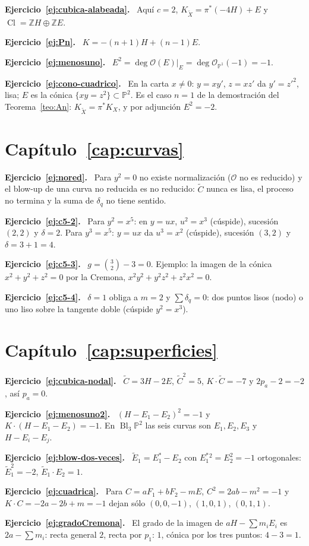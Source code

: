 \documentclass[11pt,a4paper,oneside]{book}
\newcommand{\Bl}{\operatorname{Bl}}
\newcommand{\Cl}{\operatorname{Cl}}
\newcommand{\PP}{\mathbb{P}}
\newcommand{\ZZ}{\mathbb{Z}}
\newcommand{\cO}{\mathcal{O}}
\theoremstyle{plain}
\theoremstyle{definition}
\theoremstyle{remark}
\newcommand{\sol}[1]{\par\medskip\noindent\textbf{Ejercicio~\ref{#1}.}\ }
\begin{document}
\sol{ej:cubica-alabeada} Aquí $c=2$, $K_{\tilde X}=\pi^*(-4H)+E$ y $\Cl=\ZZ H\oplus\ZZ E$.

\sol{ej:Pn} $K=-(n+1)H+(n-1)E$.

\sol{ej:menosuno} $E^2=\deg\cO(E)|_E=\deg\cO_{\PP^1}(-1)=-1$.

\sol{ej:cono-cuadrico} En la carta $x\neq0$: $y=xy'$, $z=xz'$ da $y'=z'^2$, lisa; $E$ es la cónica $\{xy=z^2\}\subset\PP^2$. Es el caso $n=1$ de la demostración del Teorema~\ref{teo:An}: $K_{\tilde X}=\pi^*K_X$, y por adjunción $E^2=-2$.

\section*{Capítulo~\ref{cap:curvas}}
\sol{ej:nored} Para $y^2=0$ no existe normalización ($\cO$ no es reducido) y el blow-up de una curva no reducida es no reducido: $\tilde C$ nunca es lisa, el proceso no termina y la suma de $\delta_q$ no tiene sentido.

\sol{ej:c5-2} Para $y^2=x^5$: en $y=ux$, $u^2=x^3$ (cúspide), sucesión $(2,2)$ y $\delta=2$. Para $y^3=x^5$: $y=ux$ da $u^3=x^2$ (cúspide), sucesión $(3,2)$ y $\delta=3+1=4$.

\sol{ej:c5-3} $g=\binom32-3=0$. Ejemplo: la imagen de la cónica $x^2+y^2+z^2=0$ por la Cremona, $x^2y^2+y^2z^2+z^2x^2=0$.

\sol{ej:c5-4} $\delta=1$ obliga a $m=2$ y $\sum\delta_q=0$: dos puntos lisos (nodo) o uno liso sobre la tangente doble (cúspide $y^2=x^3$).

\section*{Capítulo~\ref{cap:superficies}}
\sol{ej:cubica-nodal} $\tilde C=3H-2E$, $\tilde C^2=5$, $K\cdot\tilde C=-7$ y $2p_a-2=-2$, así $p_a=0$.

\sol{ej:menosuno2} $(H-E_1-E_2)^2=-1$ y $K\cdot(H-E_1-E_2)=-1$. En $\Bl_3\PP^2$ las seis curvas son $E_1,E_2,E_3$ y $H-E_i-E_j$.

\sol{ej:blow-dos-veces} $\tilde E_1=E_1^*-E_2$ con $E_1^*{}^2=E_2^2=-1$ ortogonales: $\tilde E_1^2=-2$, $\tilde E_1\cdot E_2=1$.

\sol{ej:cuadrica} Para $C=aF_1+bF_2-mE$, $C^2=2ab-m^2=-1$ y $K\cdot C=-2a-2b+m=-1$ dejan sólo $(0,0,-1)$, $(1,0,1)$, $(0,1,1)$.

\sol{ej:gradoCremona} El grado de la imagen de $aH-\sum m_iE_i$ es $2a-\sum m_i$: recta general $2$, recta por $p_1$: $1$, cónica por los tres puntos: $4-3=1$.
\end{document}
